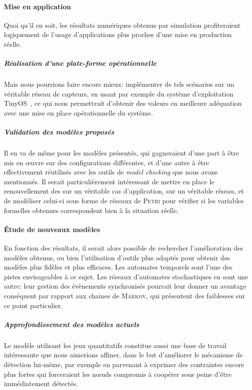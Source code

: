    \paragraph{Mise en application}
Quoi qu'il en soit, les résultats numériques obtenus par simulation profiteraient logiquement de l'usage d'applications plus proches d'une mise en production réelle.

        \vspace{-1em}
        \subparagraph{Réalisation d'une plate-forme opérationnelle}
Mais nous pourrions faire encore mieux: implémenter de tels scénarios sur un véritable réseau de capteurs, en usant par exemple du système d'exploitation TinyOS~\cite{tinyos}, ce qui nous permettrait d'obtenir des valeurs en meilleure adéquation avec une mise en place opérationnelle du système.

        \vspace{-1em}
        \subparagraph{Validation des modèles proposés}
Il en va de même pour les modèles présentés, qui gagneraient d'une part à être mis en œuvre sur des configurations différentes, et d'une autre à être effectivement réutilisés avec les outils de \textit{model checking} que nous avons mentionnés.
Il serait particulièrement intéressant de mettre en place le renouvellement des \cnst sur un véritable cas d'application, sur un véritable réseau, et de modéliser celui-ci sous forme de réseaux de \textsc{Petri} pour vérifier si les variables formelles obtenues correspondent bien à la situation réelle.

    \paragraph{Étude de nouveaux modèles}
En fonction des résultats, il serait alors possible de rechercher l'amélioration des modèles obtenus, ou bien l'utilisation d'outils plus adaptés pour obtenir des modèles plus fidèles et plus efficaces.
Les automates temporels sont l'une des pistes envisageables à ce sujet.
Les réseaux d'automates stochastiques en sont une autre: leur gestion des évènements synchronisés pourrait leur donner un avantage conséquent par rapport aux chaines de \textsc{Markov}, qui présentent des faiblesses sur ce point particulier.

        \vspace{-1em}
        \subparagraph{Approfondissement des modèles actuels}
Le modèle utilisant les jeux quantitatifs constitue aussi une base de travail intéressante que nous aimerions affiner, dans le but d'améliorer le mécanisme de détection lui-même, par exemple en parvenant à exprimer des contraintes encore plus fortes qui forceraient les nœuds compromis à coopérer sous peine d'être immédiatement détectés.

